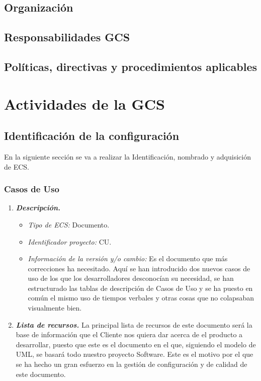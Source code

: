 \documentclass[11pt, a4paper, twoside, titlepage]{article}
\begin{document}
		\subsection{Organización}
		\subsection{Responsabilidades GCS}
		\subsection{Políticas, directivas y procedimientos aplicables}
	\section{Actividades de la GCS}
		\subsection{Identificación de la configuración} %
			En la siguiente sección se va a realizar la Identificación, nombrado y adquisición de \gls{ECS}.

			\subsubsection{Casos de Uso}
				\begin{enumerate}
					\item {\itshape \bfseries Descripción.}
						\begin{itemize}
							\item \textit{Tipo de ECS:} Documento.
							\item \textit{Identificador proyecto:} CU.
							\item \textit{Información de la versión y/o cambio:} Es el documento que más correcciones ha necesitado. Aquí se han introducido dos nuevos casos de uso de los que los desarrolladores desconocían su necesidad, se han estructurado las tablas de descripción de Casos de Uso y se ha puesto en común el mismo uso de tiempos verbales y otras cosas que no colapsaban visualmente bien.
						\end{itemize}

					\item {\itshape \bfseries Lista de recursos.}
						La principal lista de recursos de este documento será la base de información que el Cliente nos quiera dar acerca de el producto a desarrollar, puesto que este es el documento en el que, siguiendo el modelo de UML, se basará todo nuestro proyecto Software. Este es el motivo por el que se ha hecho un gran esfuerzo en la gestión de configuración y de calidad de este documento.
				\end{enumerate}
\end{document}
